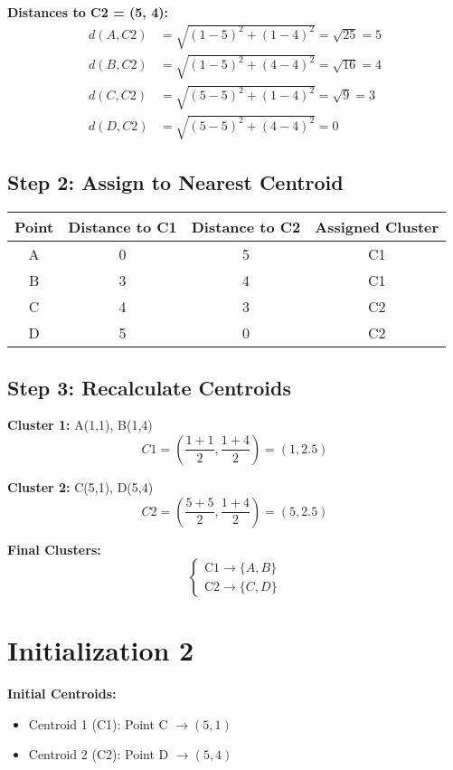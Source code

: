 \documentclass{article}
\begin{document}
\textbf{Distances to C2 = (5, 4):}
\begin{align*}
d(A, C2) &= \sqrt{(1 - 5)^2 + (1 - 4)^2} = \sqrt{25} = 5 \\
d(B, C2) &= \sqrt{(1 - 5)^2 + (4 - 4)^2} = \sqrt{16} = 4 \\
d(C, C2) &= \sqrt{(5 - 5)^2 + (1 - 4)^2} = \sqrt{9} = 3 \\
d(D, C2) &= \sqrt{(5 - 5)^2 + (4 - 4)^2} = 0
\end{align*}

\subsection*{Step 2: Assign to Nearest Centroid}

\begin{center}
\begin{tabular}{cccc}
\toprule
Point & Distance to C1 & Distance to C2 & Assigned Cluster \\
\midrule
A & 0 & 5 & C1 \\
B & 3 & 4 & C1 \\
C & 4 & 3 & C2 \\
D & 5 & 0 & C2 \\
\bottomrule
\end{tabular}
\end{center}

\subsection*{Step 3: Recalculate Centroids}

\textbf{Cluster 1:} A(1,1), B(1,4)
\[
C1 = \left( \frac{1 + 1}{2}, \frac{1 + 4}{2} \right) = (1, 2.5)
\]

\textbf{Cluster 2:} C(5,1), D(5,4)
\[
C2 = \left( \frac{5 + 5}{2}, \frac{1 + 4}{2} \right) = (5, 2.5)
\]

\textbf{Final Clusters:}
\[
\begin{cases}
\text{C1} \rightarrow \{ A, B \} \\
\text{C2} \rightarrow \{ C, D \}
\end{cases}
\]

\section*{Initialization 2}

\textbf{Initial Centroids:}
\begin{itemize}
    \item Centroid 1 (C1): Point C $\rightarrow (5, 1)$
    \item Centroid 2 (C2): Point D $\rightarrow (5, 4)$
\end{itemize}
\end{document}
